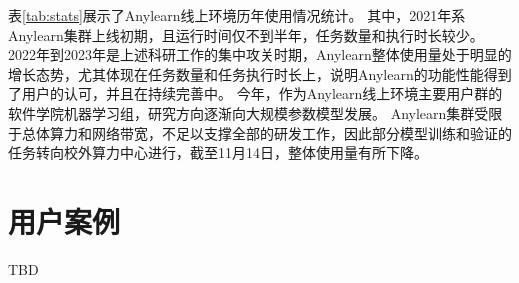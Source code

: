 表\ref{tab:stats}展示了Anylearn线上环境历年使用情况统计。
其中，2021年系Anylearn集群上线初期，且运行时间仅不到半年，任务数量和执行时长较少。
2022年到2023年是上述科研工作的集中攻关时期，Anylearn整体使用量处于明显的增长态势，尤其体现在任务数量和任务执行时长上，说明Anylearn的功能性能得到了用户的认可，并且在持续完善中。
今年，作为Anylearn线上环境主要用户群的软件学院机器学习组，研究方向逐渐向大规模参数模型发展。
Anylearn集群受限于总体算力和网络带宽，不足以支撑全部的研发工作，因此部分模型训练和验证的任务转向校外算力中心进行，截至11月14日，整体使用量有所下降。


\section{用户案例}

TBD
